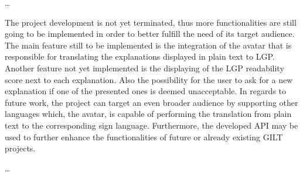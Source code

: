 \documentclass[runningheads]{llncs}
\begin{document}
\dots

The project development is not yet terminated, thus more functionalities are still going to be implemented in order to better fulfill the need of its target audience.
The main feature still to be implemented is the integration of the avatar that is responsible for translating the explanations displayed in plain text to LGP.
Another feature not yet implemented is the displaying of the LGP readability score next to each explanation.
Also the possibility for the user to ask for a new explanation if one of the presented ones is deemed unacceptable.
In regards to future work, the project can target an even broader audience by supporting other languages which, the avatar, is capable of performing the translation from plain text to the corresponding sign language.
Furthermore, the developed API may be used to further enhance the functionalities of future or already existing GILT projects.

\dots
\end{document}
